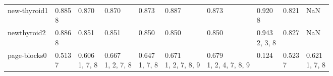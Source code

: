 \begin{tabular}{llllllllll}
new-thyroid1           &                       \makecell{0.885 \\ \scriptsize{8}} &         \makecell{0.870 \\ \scriptsize{}} &               \makecell{0.870 \\ \scriptsize{}} &                  \makecell{0.873 \\ \scriptsize{}} &               \makecell{0.887 \\ \scriptsize{}} &                     \makecell{0.873 \\ \scriptsize{}} &        \makecell{0.920 \\ \scriptsize{8}} &      \makecell{0.821 \\ \scriptsize{}} &                                       NaN \\
newthyroid2            &                       \makecell{0.886 \\ \scriptsize{8}} &         \makecell{0.851 \\ \scriptsize{}} &               \makecell{0.851 \\ \scriptsize{}} &                  \makecell{0.850 \\ \scriptsize{}} &               \makecell{0.850 \\ \scriptsize{}} &                     \makecell{0.850 \\ \scriptsize{}} &  \makecell{0.943 \\ \scriptsize{2, 3, 8}} &      \makecell{0.827 \\ \scriptsize{}} &                                       NaN \\
page-blocks0           &                       \makecell{0.513 \\ \scriptsize{7}} &  \makecell{0.606 \\ \scriptsize{1, 7, 8}} &     \makecell{0.667 \\ \scriptsize{1, 2, 7, 8}} &           \makecell{0.647 \\ \scriptsize{1, 7, 8}} &  \makecell{0.671 \\ \scriptsize{1, 2, 7, 8, 9}} &     \makecell{0.679 \\ \scriptsize{1, 2, 4, 7, 8, 9}} &         \makecell{0.124 \\ \scriptsize{}} &     \makecell{0.523 \\ \scriptsize{7}} &  \makecell{0.621 \\ \scriptsize{1, 7, 8}} \\

\end{tabular}
